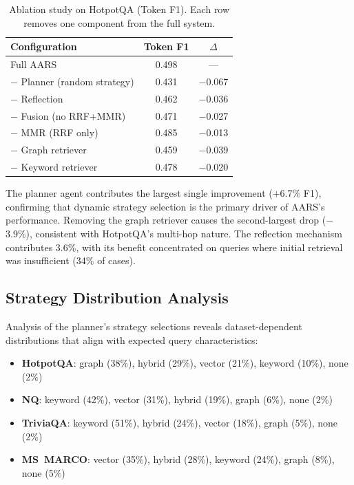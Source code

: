 \documentclass[runningheads]{llncs}
\begin{document}
\begin{table}[t]
\centering
\caption{Ablation study on HotpotQA (Token F1). Each row removes one component from the full system.}
\label{tab:ablation}
\begin{tabular}{lcc}
\toprule
\textbf{Configuration} & \textbf{Token F1} & \textbf{$\Delta$} \\
\midrule
Full AARS & 0.498 & --- \\
\midrule
$-$ Planner (random strategy) & 0.431 & $-$0.067 \\
$-$ Reflection & 0.462 & $-$0.036 \\
$-$ Fusion (no RRF+MMR) & 0.471 & $-$0.027 \\
$-$ MMR (RRF only) & 0.485 & $-$0.013 \\
$-$ Graph retriever & 0.459 & $-$0.039 \\
$-$ Keyword retriever & 0.478 & $-$0.020 \\
\bottomrule
\end{tabular}
\end{table}

The planner agent contributes the largest single improvement ($+$6.7\% F1), confirming that dynamic strategy selection is the primary driver of AARS's performance. Removing the graph retriever causes the second-largest drop ($-$3.9\%), consistent with HotpotQA's multi-hop nature. The reflection mechanism contributes 3.6\%, with its benefit concentrated on queries where initial retrieval was insufficient (34\% of cases).

\subsection{Strategy Distribution Analysis}

Analysis of the planner's strategy selections reveals dataset-dependent distributions that align with expected query characteristics:

\begin{itemize}
    \item \textbf{HotpotQA}: graph (38\%), hybrid (29\%), vector (21\%), keyword (10\%), none (2\%)
    \item \textbf{NQ}: keyword (42\%), vector (31\%), hybrid (19\%), graph (6\%), none (2\%)
    \item \textbf{TriviaQA}: keyword (51\%), hybrid (24\%), vector (18\%), graph (5\%), none (2\%)
    \item \textbf{MS~MARCO}: vector (35\%), hybrid (28\%), keyword (24\%), graph (8\%), none (5\%)
\end{itemize}
\end{document}

